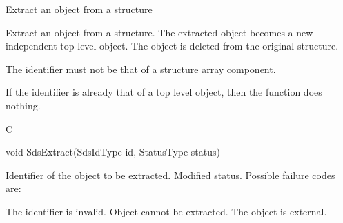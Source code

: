 \begin{manroutinedescription}
      Extract an object from a structure

      Extract an object from a structure. The extracted object becomes a
      new independent top level object. The object is deleted from
      the original structure.

      The identifier must not be that of a structure array component.
 
      If the identifier is already that of a top level object, then the
      function does nothing.

      C

      void SdsExtract(SdsIdType id, StatusType {\mantt{*}} {} %
status)
 
\begin{manparametertable}
  Identifier of the object to be %
extracted.
 Modified status. Possible %
failure codes are:
\end{manparametertable}
\begin{mantwocolumntable}
The identifier is invalid.
Object cannot be extracted.
The object is external.
\end{mantwocolumntable}
\end{manroutinedescription}



